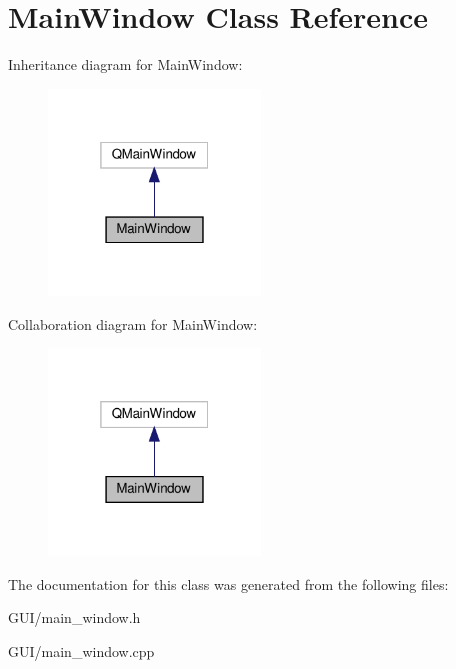 \hypertarget{classMainWindow}{}\section{Main\+Window Class Reference}
\label{classMainWindow}


Inheritance diagram for Main\+Window\+:
\nopagebreak
\begin{figure}[H]
\begin{center}
\leavevmode
\includegraphics[width=160pt]{classMainWindow__inherit__graph}
\end{center}
\end{figure}


Collaboration diagram for Main\+Window\+:
\nopagebreak
\begin{figure}[H]
\begin{center}
\leavevmode
\includegraphics[width=160pt]{classMainWindow__coll__graph}
\end{center}
\end{figure}


The documentation for this class was generated from the following files\+:\begin{DoxyCompactItemize}
\item 
G\+U\+I/main\+\_\+window.\+h\item 
G\+U\+I/main\+\_\+window.\+cpp\end{DoxyCompactItemize}
